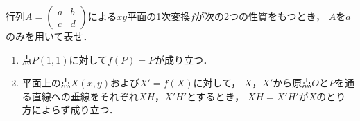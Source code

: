 \documentclass[../../main.tex]{subfiles}
\begin{document}
行列$A=
\begin{pmatrix} a & b \\ c & d
\end{pmatrix}$による$xy$平面の1次変換$f$が次の2つの性質をもつとき，
$A$を$a$のみを用いて表せ．
\begin{enumerate}
  \item 点$P(1,1)$に対して$f(P)=P$が成り立つ．
  \item 平面上の点$X(x,y)$および$X'=f(X)$に対して，
    $X$，$X'$から原点$O$と$P$を通る直線への垂線をそれぞれ$XH$，$X'H'$とするとき，
    $XH=X'H'$が$X$のとり方によらず成り立つ．
\end{enumerate}
\end{document}
